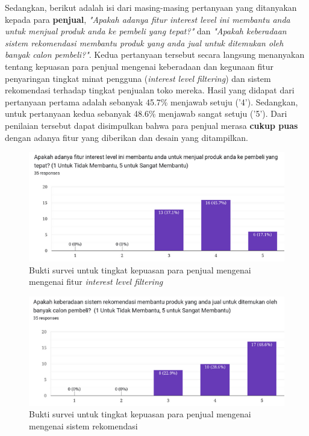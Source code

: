 \documentclass[a4paper]{article}
\begin{document}
\begin{enumerate}
\begin{itemize}
        Sedangkan, berikut adalah isi dari masing-masing pertanyaan yang ditanyakan kepada para \textbf{penjual}, \textit{"Apakah adanya fitur interest level ini membantu anda untuk menjual produk anda ke pembeli yang tepat?"} dan \textit{"Apakah keberadaan sistem rekomendasi membantu produk yang anda jual untuk ditemukan oleh banyak calon pembeli?"}. Kedua pertanyaan tersebut secara langsung menanyakan tentang kepuasan para penjual mengenai keberadaan dan kegunaan fitur penyaringan tingkat minat pengguna (\textit{interest level filtering}) dan sistem rekomendasi terhadap tingkat penjualan toko mereka. Hasil yang didapat dari pertanyaan pertama adalah sebanyak 45.7\% menjawab  setuju ('4'). Sedangkan, untuk pertanyaan kedua sebanyak 48.6\% menjawab sangat setuju ('5'). Dari penilaian tersebut dapat disimpulkan bahwa para penjual merasa \textbf{cukup puas} dengan adanya fitur yang diberikan dan desain yang ditampilkan. 

        \begin{figure}[h]
            \centering
            \includegraphics[scale=0.50]{images/evaluasi ui merchant 2/Survei 3 - Pertanyaan 1.png}
            \caption{Bukti survei untuk tingkat kepuasan para penjual mengenai mengenai fitur \textit{interest level filtering}}
            \label{fig:merchantInterestLevel}
        \end{figure}

        \begin{figure}[h]
            \centering
            \includegraphics[scale=0.50]{images/evaluasi ui merchant 2/Survei 3 - Pertanyaan 2.png}
            \caption{Bukti survei untuk tingkat kepuasan para penjual mengenai mengenai sistem rekomendasi}
            \label{fig:merchantRecommendation}
        \end{figure}

    \end{itemize}

\end{enumerate}
\end{document}
